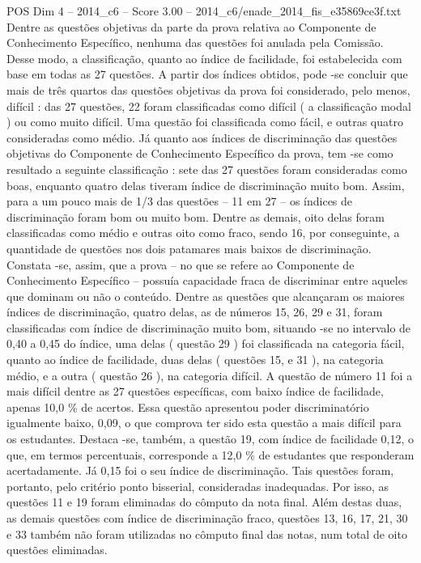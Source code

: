 \begin{textsample}{POS Dim 4 – 2014\_c6 – Score 3.00 – 2014\_c6/enade\_2014\_fis\_e35869ce3f.txt}
Dentre as questões objetivas da parte da prova relativa ao Componente de Conhecimento Específico, nenhuma das questões foi anulada pela Comissão.
Desse modo, a classificação, quanto ao índice de facilidade, foi estabelecida com base em todas as 27 questões.
A partir dos índices obtidos, pode -se concluir que mais de três quartos das questões objetivas da prova foi considerado, pelo menos, difícil : das 27 questões, 22 foram classificadas como difícil ( a classificação modal ) ou como muito difícil.
Uma questão foi classificada como fácil, e outras quatro consideradas como médio.
Já quanto aos índices de discriminação das questões objetivas do Componente de Conhecimento Específico da prova, tem -se como resultado a seguinte classificação : sete das 27 questões foram consideradas como boas, enquanto quatro delas tiveram índice de discriminação muito bom.
Assim, para a um pouco mais de 1/3 das questões – 11 em 27 – os índices de discriminação foram bom ou muito bom.
Dentre as demais, oito delas foram classificadas como médio e outras oito como fraco, sendo 16, por conseguinte, a quantidade de questões nos dois patamares mais baixos de discriminação.
Constata -se, assim, que a prova – no que se refere ao Componente de Conhecimento Específico – possuía capacidade fraca de discriminar entre aqueles que dominam ou não o conteúdo.
Dentre as questões que alcançaram os maiores índices de discriminação, quatro delas, as de números 15, 26, 29 e 31, foram classificadas com índice de discriminação muito bom, situando -se no intervalo de 0,40 a 0,45 do índice, uma delas ( questão 29 ) foi classificada na categoria fácil, quanto ao índice de facilidade, duas delas ( questões 15, e 31 ), na categoria médio, e a outra ( questão 26 ), na categoria difícil.
A questão de número 11 foi a mais difícil dentre as 27 questões específicas, com baixo índice de facilidade, apenas 10,0 \% de acertos.
Essa questão apresentou poder discriminatório igualmente baixo, 0,09, o que comprova ter sido esta questão a mais difícil para os estudantes.
Destaca -se, também, a questão 19, com índice de facilidade 0,12, o que, em termos percentuais, corresponde a 12,0 \% de estudantes que responderam acertadamente.
Já 0,15 foi o seu índice de discriminação.
Tais questões foram, portanto, pelo critério ponto bisserial, consideradas inadequadas.
Por isso, as questões 11 e 19 foram eliminadas do cômputo da nota final.
Além destas duas, as demais questões com índice de discriminação fraco, questões 13, 16, 17, 21, 30 e 33 também não foram utilizadas no cômputo final das notas, num total de oito questões eliminadas.

\end{textsample}
